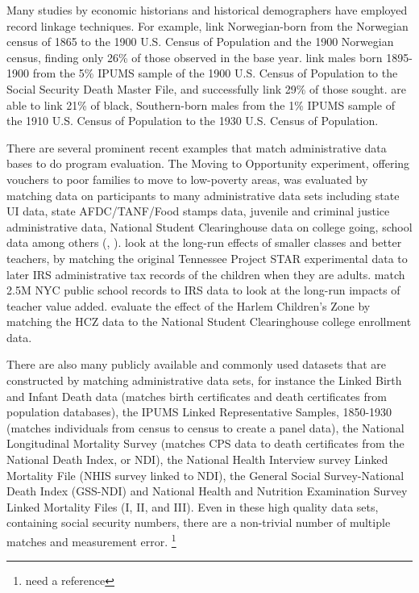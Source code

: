 \documentclass[12pt]{article}
\renewcommand{\cite}{\citeasnoun}
\begin{document}
Many studies by economic historians and historical demographers have
employed record linkage techniques. For example, \cite{Abramitzky2012} link
Norwegian-born from the Norwegian census of 1865 to the 1900 U.S. Census of
Population and the 1900 Norwegian census, finding only 26\% of those
observed in the base year. \cite{FerrieRolf2011} link males born 1895-1900
from the 5\% IPUMS sample of the 1900 U.S. Census of Population to the
Social Security Death Master File, and successfully link 29\% of those
sought. \cite{CollinsWanamaker2013} are able to link 21\% of black,
Southern-born males from the 1\% IPUMS sample of the 1910 U.S. Census of
Population to the 1930 U.S. Census of Population.

There are several prominent recent examples that match administrative data
bases to do program evaluation. The Moving to Opportunity experiment,
offering vouchers to poor families to move to low-poverty areas, was
evaluated by matching data on participants to many administrative data sets
including state UI data, state AFDC/TANF/Food stamps data, juvenile and
criminal justice administrative data, National Student Clearinghouse data on
college going, school data among others (\cite{Kling2007}, \cite{Kling2005}%
). \cite{Chettyteachers2013} look at the long-run effects of smaller classes
and better teachers, by matching the original Tennessee Project STAR
experimental data to later IRS administrative tax records of the children
when they are adults. \cite{Chettykindergarten2011} match 2.5M NYC public
school records to IRS data to look at the long-run impacts of teacher value
added. \cite{DobbieFryer2011} evaluate the effect of the Harlem Children's
Zone by matching the HCZ data to the National Student Clearinghouse college
enrollment data.

There are also many publicly available and commonly used datasets that are
constructed by matching administrative data sets, for instance the Linked
Birth and Infant Death data (matches birth certificates and death
certificates from population databases), the IPUMS Linked Representative
Samples, 1850-1930 (matches individuals from census to census to create a
panel data), the National Longitudinal Mortality Survey (matches CPS data to
death certificates from the National Death Index, or NDI), the National
Health Interview survey Linked Mortality File (NHIS survey linked to NDI),
the General Social Survey-National Death Index (GSS-NDI) and National Health
and Nutrition Examination Survey Linked Mortality Files (I, II, and III).
Even in these high quality data sets, containing social security numbers,
there are a non-trivial number of multiple matches and measurement error.%
\footnote{%
need a reference}
\end{document}
